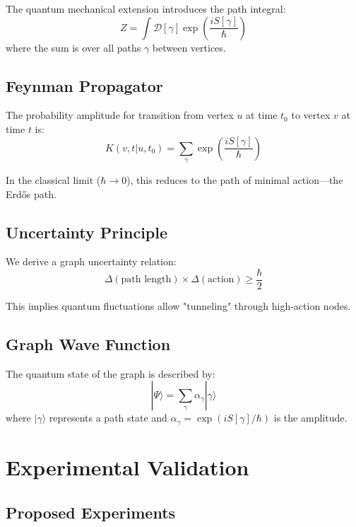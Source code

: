 \documentclass[12pt,a4paper]{article}
\begin{document}
The quantum mechanical extension introduces the path integral:
\begin{equation}
Z = \int \mathcal{D}[\gamma] \exp\left(\frac{iS[\gamma]}{\hbar}\right)
\end{equation}
where the sum is over all paths $\gamma$ between vertices.

\subsection{Feynman Propagator}

The probability amplitude for transition from vertex $u$ at time $t_0$ to vertex $v$ at time $t$ is:
\begin{equation}
K(v,t|u,t_0) = \sum_{\gamma} \exp\left(\frac{iS[\gamma]}{\hbar}\right)
\end{equation}

In the classical limit ($\hbar \to 0$), this reduces to the path of minimal action—the Erdős path.

\subsection{Uncertainty Principle}

We derive a graph uncertainty relation:
\begin{equation}
\Delta(\text{path length}) \times \Delta(\text{action}) \geq \frac{\hbar}{2}
\end{equation}

This implies quantum fluctuations allow "tunneling" through high-action nodes.

\subsection{Graph Wave Function}

The quantum state of the graph is described by:
\begin{equation}
|\Psi\rangle = \sum_{\gamma} \alpha_{\gamma}|\gamma\rangle
\end{equation}
where $|\gamma\rangle$ represents a path state and $\alpha_{\gamma} = \exp(iS[\gamma]/\hbar)$ is the amplitude.

\section{Experimental Validation}

\subsection{Proposed Experiments}
\end{document}

